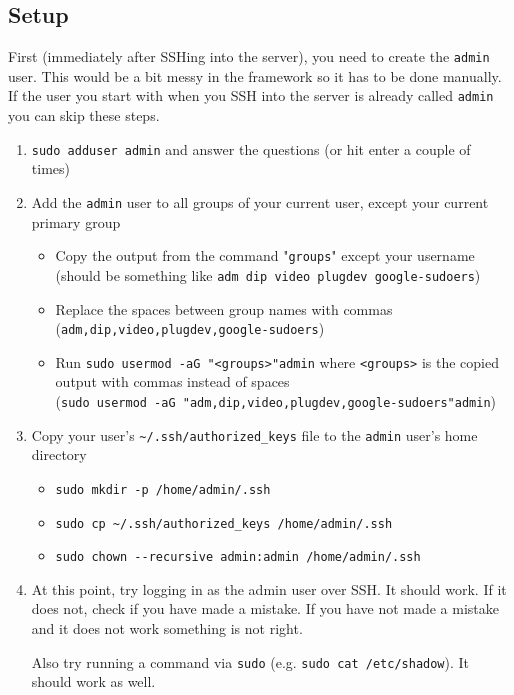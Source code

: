 \documentclass[12pt,a4paper]{report}
\begin{document}
	\subsection{Setup}
	First (immediately after SSHing into the server), you need to create the \lstinline|admin| user. This would be a bit messy in the framework so it has to be done manually. If the user you start with when you SSH into the server is already called \lstinline|admin| you can skip these steps.
	
	\begin{enumerate}
		\item \lstinline|sudo adduser admin| and answer the questions (or hit enter a couple of times)
		\item Add the \lstinline|admin| user to all groups of your current user, except your current primary group
		\begin{itemize}
			\item Copy the output from the command "\lstinline|groups|" except your username (should be something like \lstinline|adm dip video plugdev google-sudoers|)
			\item Replace the spaces between group names with commas\\(\lstinline|adm,dip,video,plugdev,google-sudoers|)
			\item Run \lstinline|sudo usermod -aG "<groups>"|\space\lstinline|admin| where \lstinline|<groups>| is the copied output with commas instead of spaces\\(\lstinline|sudo usermod -aG "adm,dip,video,plugdev,google-sudoers"|\space\lstinline|admin|)
		\end{itemize}
		\item Copy your user's \lstinline|~/.ssh/authorized_keys| file to the \lstinline|admin| user's home directory
		\begin{itemize}
			\item \lstinline|sudo mkdir -p /home/admin/.ssh|
			\item \lstinline|sudo cp ~/.ssh/authorized_keys /home/admin/.ssh|
			\item \lstinline|sudo chown --recursive admin:admin /home/admin/.ssh|
		\end{itemize}
		\item At this point, try logging in as the admin user over SSH. It should work. If it does not, check if you have made a mistake. If you have not made a mistake and it does not work something is not right.
		
		Also try running a command via \lstinline|sudo| (e.g. \lstinline|sudo cat /etc/shadow|). It should work as well.
	\end{enumerate}
\end{document}
